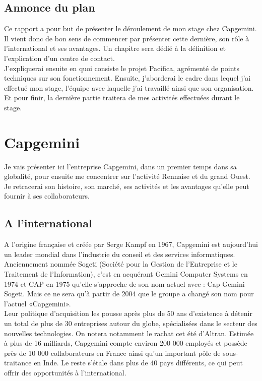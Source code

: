 \documentclass{rapport}
\begin{document}
\subsection*{Annonce du plan}

Ce rapport a pour but de présenter le déroulement de mon stage chez Capgemini. Il vient donc de bon sens de commencer par présenter cette dernière, son rôle à l'international et ses avantages.
Un chapitre sera dédié à la définition et l'explication d'un centre de contact.\\
J'expliquerai ensuite en quoi consiste le projet Pacifica, agrémenté de points techniques sur son fonctionnement.
Ensuite, j'aborderai le cadre dans lequel j'ai effectué mon stage, l'équipe avec laquelle j'ai travaillé ainsi que son organisation.\\
Et pour finir, la dernière partie traitera de mes activités effectuées durant le stage.

\newpage

\section{Capgemini}

Je vais présenter ici l'entreprise Capgemini, dans un premier temps dans sa globalité, pour ensuite me concentrer sur l’activité Rennaise et du grand Ouest. Je retracerai son histoire, son marché, ses activités et les avantages qu'elle peut fournir à ses collaborateurs.

\subsection{A l'international}

A l'origine française et créée par Serge Kampf en 1967, Capgemini est aujourd'hui un leader mondial dans l'industrie du conseil et des services informatiques. Anciennement nommée Sogeti (Société pour la Gestion de l'Entreprise et le Traitement de l'Information), c'est en acquérant Gemini Computer Systems en 1974 et CAP en 1975 qu'elle s'approche de son nom actuel avec : Cap Gemini Sogeti. Mais ce ne sera qu'à partir de 2004 que le groupe a changé son nom pour l'actuel «Capgemini».\\

Leur politique d'acquisition les pousse après plus de 50 ans d'existence à détenir un total de plus de 30 entreprises autour du globe, spécialisées dans le secteur des nouvelles technologies. On notera notamment le rachat cet été d'Altran.
Estimée à plus de 16 milliards, Capgemini compte environ 200 000 employés et possède près de 10 000 collaborateurs en France ainsi qu'un important pôle de sous-traitance en Inde. Le reste s’étale dans plus de 40 pays différents, ce qui peut offrir des opportunités à l'international.
\end{document}
